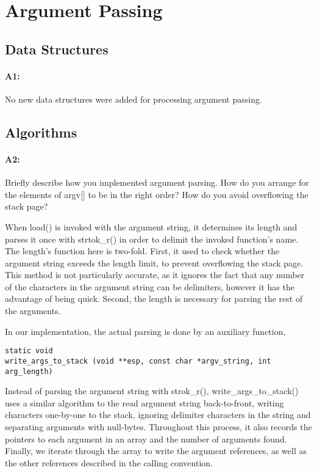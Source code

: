 \section{Argument Passing}
\subsection{Data Structures}
\paragraph{A1:} %
No new data structures were added for processing argument passing.

\subsection{Algorithms}
\paragraph{A2:} %
Briefly describe how you implemented argument parsing.  How do you arrange for the elements of argv[] to be in the right order? How do you avoid overflowing the stack page?

When load() is invoked with the argument string, it determines its length and parses it once with strtok\_r() in order to delimit the invoked function's name.
The length's function here is two-fold.
First, it used to check whether the argument string exceeds the length limit, to prevent overflowing the stack page.
This method is not particularly accurate, as it ignores the fact that any number of the characters in the argument string can be delimiters, however it has the advantage of being quick.
Second, the length is necessary for parsing the rest of the arguments.

In our implementation, the actual parsing is done by an auxiliary function,
\begin{verbatim}
static void
write_args_to_stack (void **esp, const char *argv_string, int arg_length)
\end{verbatim}

Instead of parsing the argument string with strok\_r(), write\_args\_to\_stack() uses a similar algorithm to the read argument string back-to-front, writing characters one-by-one to the stack, ignoring delimiter characters in the string and separating arguments with null-bytes.
Throughout this process, it also records the pointers to each argument in an array and the number of arguments found.
Finally, we iterate through the array to write the argument references, as well as the other references described in the calling convention.

